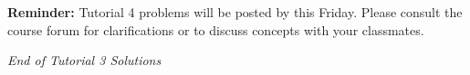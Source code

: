 \documentclass[12pt]{article}
\theoremstyle{definition}
\theoremstyle{plain}
\newenvironment{administrative_note}
  {\vspace{1em}\noindent\setlength{\fboxrule}{1pt}\begin{Sbox}\begin{minipage}{0.98\textwidth}\color{blue}\sffamily\large}
  {\end{minipage}\end{Sbox}\fbox{\TheSbox}\vspace{1em}}
\begin{document}
\begin{administrative_note}
\textbf{Reminder:} Tutorial 4 problems will be posted by this Friday. Please consult the course forum for clarifications or to discuss concepts with your classmates.
\end{administrative_note}

\vspace{3em}
\begin{center}
    \Large \textit{End of Tutorial 3 Solutions}
\end{center}
\end{document}
